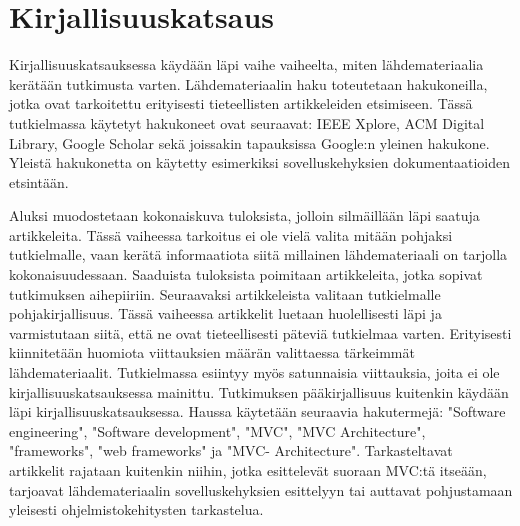 \documentclass[utf8]{gradu3}
\begin{document}
\chapter{Kirjallisuuskatsaus}

Kirjallisuuskatsauksessa käydään läpi vaihe vaiheelta, miten
lähdemateriaalia kerätään tutkimusta varten. Lähdemateriaalin 
haku toteutetaan hakukoneilla, jotka ovat tarkoitettu erityisesti 
tieteellisten artikkeleiden etsimiseen. Tässä tutkielmassa käytetyt 
hakukoneet ovat seuraavat: IEEE Xplore, ACM Digital Library, 
Google Scholar sekä joissakin tapauksissa Google:n yleinen
hakukone. Yleistä hakukonetta on käytetty esimerkiksi
sovelluskehyksien dokumentaatioiden etsintään.

Aluksi muodostetaan kokonaiskuva tuloksista, jolloin silmäillään läpi
saatuja artikkeleita. Tässä vaiheessa tarkoitus ei ole vielä valita
mitään pohjaksi tutkielmalle, vaan kerätä informaatiota siitä
millainen lähdemateriaali on tarjolla kokonaisuudessaan. Saaduista 
tuloksista poimitaan artikkeleita, jotka sopivat tutkimuksen aihepiiriin.
Seuraavaksi artikkeleista valitaan tutkielmalle
pohjakirjallisuus. Tässä vaiheessa artikkelit luetaan huolellisesti
läpi ja varmistutaan siitä, että ne ovat tieteellisesti päteviä
tutkielmaa varten. Erityisesti kiinnitetään huomiota viittauksien
määrän valittaessa tärkeimmät lähdemateriaalit. Tutkielmassa esiintyy myös satunnaisia viittauksia,
joita ei ole kirjallisuuskatsauksessa mainittu. Tutkimuksen
pääkirjallisuus kuitenkin käydään läpi kirjallisuuskatsauksessa.
Haussa käytetään seuraavia hakutermejä: "Software engineering", "Software development", "MVC", "MVC Architecture",
"frameworks", "web frameworks" ja  "MVC- Architecture".
Tarkasteltavat artikkelit rajataan kuitenkin niihin,
jotka esittelevät suoraan MVC:tä itseään, tarjoavat
lähdemateriaalin sovelluskehyksien esittelyyn tai auttavat pohjustamaan yleisesti ohjelmistokehitysten tarkastelua.
\end{document}
